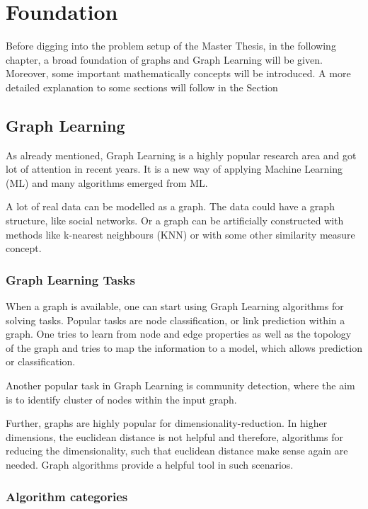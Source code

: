 \chapter{Foundation}
\label{sec:foundation}


Before digging into the problem setup of the Master Thesis, in the following chapter, a broad foundation
of graphs and Graph Learning will be given. Moreover, some important mathematically concepts will be introduced.
A more detailed explanation to some sections will follow in the Section~


\section{Graph Learning}
As already mentioned, Graph Learning is a highly popular research area and got lot of attention in recent years.
It is a new way of applying Machine Learning (ML) and many algorithms emerged from ML.

A lot of real data can be modelled as a graph. The data could have a graph structure, like social networks. 
Or a graph can be artificially constructed with methods like k-nearest neighbours (KNN) or with some other similarity
measure concept.

\subsection{Graph Learning Tasks}
When a graph is available, one can start using Graph Learning algorithms for solving tasks.
Popular tasks are node classification, or link prediction within a graph. One tries to learn from node and edge properties 
as well as the topology of the graph and tries to map the information to a model, which allows prediction or classification.

Another popular task in Graph Learning is community detection, where the aim is to identify cluster of nodes within the input graph.

Further, graphs are highly popular for dimensionality-reduction. In higher dimensions, the euclidean distance is not helpful and therefore,
algorithms for reducing the dimensionality, such that euclidean distance make sense again are needed. 
Graph algorithms provide a helpful tool in such scenarios.

\subsection{Algorithm categories}
